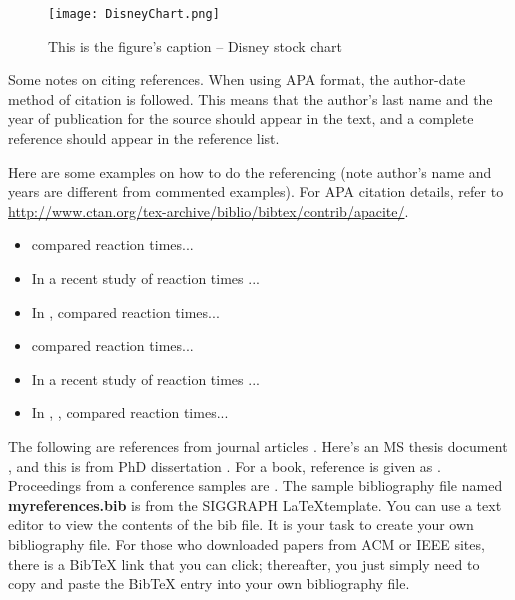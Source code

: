 \begin{figure}[t]                %
   \centering                    %
   \texttt{[image: DisneyChart.png]}      %
   \caption{This is the figure's caption -- Disney stock chart}
    \label{fig:disneystock}
\end{figure}


Some notes on citing references.   When using APA format, the author-date method of citation is 
followed.   This means that the author's last name and the year of publication for the source should 
appear in the text, and a complete reference should appear in the reference list.

%
%

Here are some examples on how to do the referencing (note author's name and years are different
from commented examples).  For APA citation details, refer
to \url{http://www.ctan.org/tex-archive/biblio/bibtex/contrib/apacite/}. 

\begin{itemize}
 \item {} compared reaction times...
 \item In a recent study of reaction times \cite{kartch:2000:ERA}...
 \item In , \citeauthor{kartch:2000:ERA} compared reaction times...
 \item {} compared reaction times... 
 \item In a recent study of reaction times \cite{fedkiw:2001:VSO}...
 \item In , , compared reaction times...
\end{itemize}

The following are references from journal articles \cite{Park:2006:DSI, Pellacini:2005:LAH, 
sako:2001:SSB}.  Here's an MS thesis document \cite{yee:2000:SSA}, and this is from
PhD dissertation \cite{kartch:2000:ERA}. For a book, reference is given as 
\cite{parke:1996:CFA}.  Proceedings from a conference samples are \cite{Jobs95, fedkiw:2001:VSO,
levoy:2000:TDM}.  The sample bibliography file named \textbf{myreferences.bib} is from the
SIGGRAPH \LaTeX template.  You can use a text editor to view the contents of the bib file.  
It is your task to create your own bibliography file.  For those who downloaded papers from
ACM or IEEE sites, there is a BibTeX link that you can click; thereafter, you just simply need
to copy and paste the BibTeX entry into your own bibliography file.



